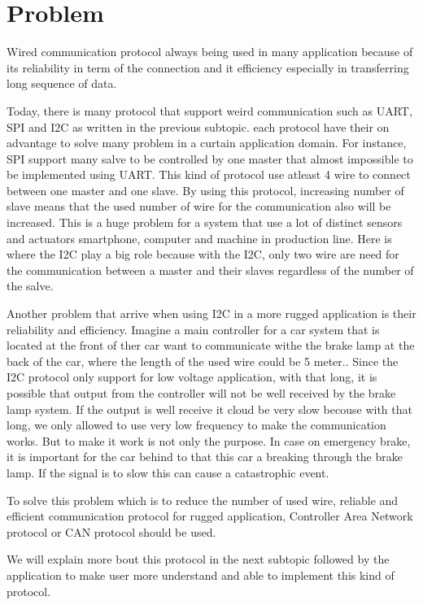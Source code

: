 
\section{Problem}
	Wired communication protocol always being used in many application because of its reliability in term of the connection and it efficiency especially  in transferring long sequence of data.
	
	Today, there is many protocol that support weird communication such as UART, SPI and I2C as written in the previous subtopic. each protocol have their on advantage to solve many problem in a curtain application domain. For instance, SPI support many salve to be controlled by one master that almost impossible to be implemented using UART. This kind of protocol use atleast 4 wire to connect between one master and one slave. By using this protocol, increasing number of slave means that the used number of wire for the communication also will be increased. This is a huge problem for a system that use a lot of distinct sensors and actuators smartphone, computer and machine in production line. Here is where the I2C play a big role because with the I2C, only two wire are need for the communication between a master and their slaves regardless of the number of the salve.
	
	Another problem that arrive when using I2C in a more rugged application is their reliability and efficiency. Imagine a main controller for a car system that is located at the front of ther car want to communicate withe the brake lamp at the back of the car, where the length of the used wire could be 5 meter.. Since the I2C protocol only support for low voltage application, with that long, it is possible that output from the controller will not be well received by the brake lamp system. If the output is well receive it cloud be very slow becouse with that long, we only allowed to use very low frequency to make the communication works. But to make it work is not only the purpose. In case on emergency brake, it is important for the car behind to that this car a breaking through the brake lamp. If the signal is to slow this can cause a catastrophic event.
	
	To solve this problem which is to reduce the number of used wire, reliable and efficient communication protocol for rugged application, Controller Area Network protocol or CAN protocol should be used. 
	
	We will explain more bout this protocol in the next subtopic followed by the application to make user more understand and able to implement this kind of protocol.



